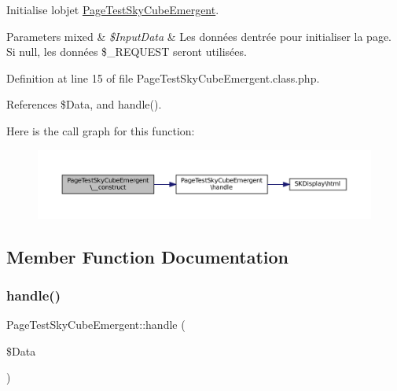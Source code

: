 Initialise l\textquotesingle{}objet \hyperlink{class_page_test_sky_cube_emergent}{Page\+Test\+Sky\+Cube\+Emergent}.


\begin{DoxyParams}[1]{Parameters}
mixed & {\em \$\+Input\+Data} & Les données d\textquotesingle{}entrée pour initialiser la page. Si null, les données \$\+\_\+\+R\+E\+Q\+U\+E\+ST seront utilisées. \\
\hline
\end{DoxyParams}


Definition at line 15 of file Page\+Test\+Sky\+Cube\+Emergent.\+class.\+php.



References \$\+Data, and handle().

Here is the call graph for this function\+:\nopagebreak
\begin{figure}[H]
\begin{center}
\leavevmode
\includegraphics[width=350pt]{class_page_test_sky_cube_emergent_ab90c6af6f164a539a33851108f7b8eab_cgraph}
\end{center}
\end{figure}


\subsection{Member Function Documentation}
\mbox{\label{class_page_test_sky_cube_emergent_ae647129c2df8c0183927f0eaecd3a690}} 
\subsubsection{\texorpdfstring{handle()}{handle()}}
{\footnotesize\ttfamily Page\+Test\+Sky\+Cube\+Emergent\+::handle (\begin{DoxyParamCaption}\item[{}]{\$\+Data }\end{DoxyParamCaption})\hspace{0.3cm}{\ttfamily [protected]}}

